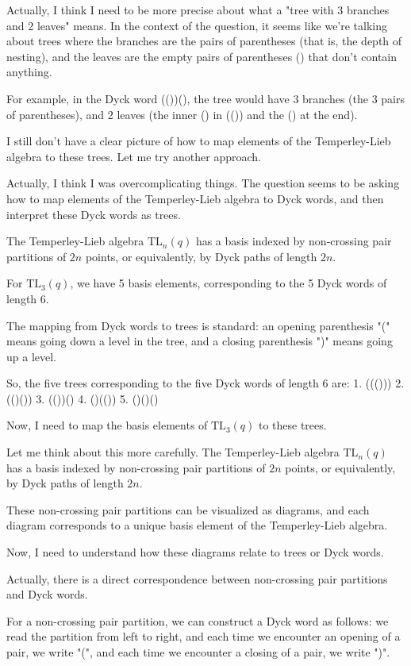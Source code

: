 \documentclass[12p]{article}
\newcounter{reasoningcounter}
\newenvironment{reasoning}[1][]
{\refstepcounter{reasoningcounter}%
\begin{tcolorbox}[
    title=Reasoning \thereasoningcounter: #1,
    colback=white, %
    colframe=gray,
    coltext=black, %
    fonttitle=\bfseries\normalsize,
    top=2mm,
    bottom=2mm,
    enlarge top initially by=5mm
]
\small
}
{\end{tcolorbox}}
\begin{document}
\begin{reasoning}
Actually, I think I need to be more precise about what a "tree with 3 branches and 2 leaves" means. In the context of the question, it seems like we're talking about trees where the branches are the pairs of parentheses (that is, the depth of nesting), and the leaves are the empty pairs of parentheses () that don't contain anything.

For example, in the Dyck word (())(), the tree would have 3 branches (the 3 pairs of parentheses), and 2 leaves (the inner () in (()) and the () at the end).

I still don't have a clear picture of how to map elements of the Temperley-Lieb algebra to these trees. Let me try another approach.

Actually, I think I was overcomplicating things. The question seems to be asking how to map elements of the Temperley-Lieb algebra to Dyck words, and then interpret these Dyck words as trees.

The Temperley-Lieb algebra $\text{TL}_n(q)$ has a basis indexed by non-crossing pair partitions of $2n$ points, or equivalently, by Dyck paths of length $2n$.

For $\text{TL}_3(q)$, we have 5 basis elements, corresponding to the 5 Dyck words of length 6.

The mapping from Dyck words to trees is standard: an opening parenthesis "(" means going down a level in the tree, and a closing parenthesis ")" means going up a level.

So, the five trees corresponding to the five Dyck words of length 6 are:
1. ((()))
2. (()())
3. (())()
4. ()(())
5. ()()()

Now, I need to map the basis elements of $\text{TL}_3(q)$ to these trees.

Let me think about this more carefully. The Temperley-Lieb algebra $\text{TL}_n(q)$ has a basis indexed by non-crossing pair partitions of $2n$ points, or equivalently, by Dyck paths of length $2n$.

These non-crossing pair partitions can be visualized as diagrams, and each diagram corresponds to a unique basis element of the Temperley-Lieb algebra.

Now, I need to understand how these diagrams relate to trees or Dyck words.

Actually, there is a direct correspondence between non-crossing pair partitions and Dyck words. 

For a non-crossing pair partition, we can construct a Dyck word as follows: we read the partition from left to right, and each time we encounter an opening of a pair, we write "(", and each time we encounter a closing of a pair, we write ")".


\end{reasoning}
\end{document}
